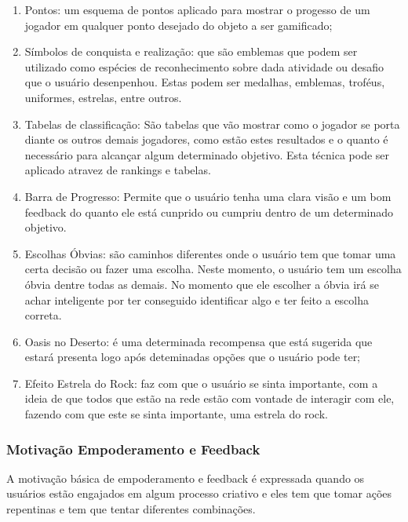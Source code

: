 \begin{enumerate}
    \item Pontos: um esquema de pontos aplicado para mostrar o progesso
        de um jogador em qualquer ponto desejado do objeto a ser gamificado;
    \item Símbolos de conquista e realização: que são emblemas que podem
        ser utilizado como espécies de reconhecimento sobre dada
        atividade ou desafio que o usuário desenpenhou. Estas podem ser
        medalhas, emblemas, troféus, uniformes, estrelas, entre outros.
    \item Tabelas de classificação: São tabelas que vão mostrar como o
        jogador se porta diante os outros demais jogadores, como
        estão estes resultados e o quanto é necessário para alcançar
        algum determinado objetivo. Esta técnica pode ser aplicado atravez
        de rankings e tabelas.
    \item Barra de Progresso: Permite que o usuário tenha uma clara visão
        e um bom feedback do quanto ele está cunprido ou cumpriu dentro
        de um determinado objetivo.
    \item Escolhas Óbvias: são caminhos diferentes onde o usuário tem que tomar
        uma certa decisão ou fazer uma escolha. Neste momento, o usuário tem um
        escolha óbvia dentre todas as demais. No momento que ele escolher a óbvia
        irá se achar inteligente por ter conseguido identificar algo e ter
        feito a escolha correta.
    \item Oasis no Deserto: é uma determinada recompensa que está sugerida
        que estará presenta logo após deteminadas opções que o usuário
        pode ter;
    \item Efeito Estrela do Rock: faz com que o usuário se sinta importante,
        com a ideia de que todos que estão na rede estão com vontade de interagir
        com ele, fazendo com que este se sinta importante, uma estrela do rock.
\end{enumerate}

\subsubsection{Motivação Empoderamento e Feedback}
\label{sub:empoderamentoefeedback}
A motivação básica de empoderamento e feedback é expressada quando os usuários
estão engajados em algum processo criativo e eles tem que tomar ações repentinas
e tem que tentar diferentes combinações.

